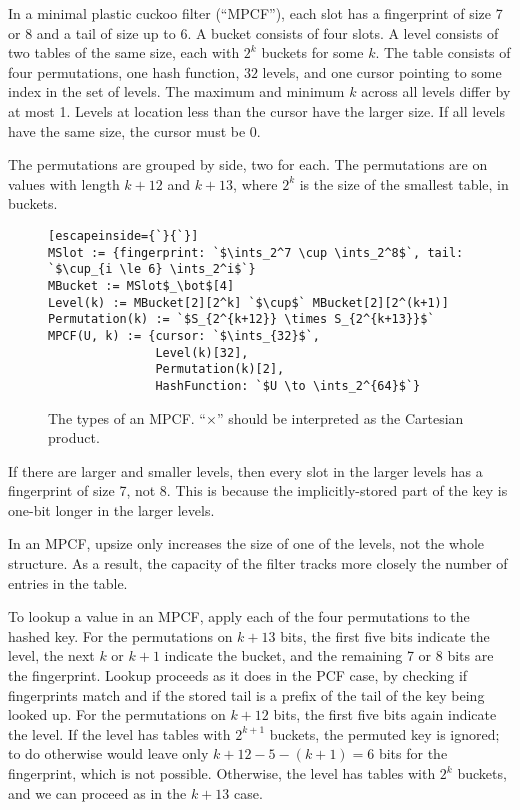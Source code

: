 \documentclass[letterpaper, 11pt]{article}
\newcommand{\ints}{\mathbb{Z}}
\begin{document}
In a minimal plastic cuckoo filter (``MPCF''), each slot has a fingerprint of size 7 or 8 and a tail of size up to 6.
A bucket consists of four slots.
A level consists of two tables of the same size, each with $2^k$ buckets for some $k$.
The table consists of four permutations, one hash function, $32$ levels, and one cursor pointing to some index in the set of levels.
The maximum and minimum $k$ across all levels differ by at most 1.
Levels at location less than the cursor have the larger size.
If all levels have the same size, the cursor must be 0.

The permutations are grouped by side, two for each.
The permutations are on values with length $k + 12$ and $k + 13$, where $2^k$ is the size of the smallest table, in buckets.

\begin{figure}
\begin{lstlisting}[escapeinside={`}{`}]
MSlot := {fingerprint: `$\ints_2^7 \cup \ints_2^8$`, tail: `$\cup_{i \le 6} \ints_2^i$`}
MBucket := MSlot$_\bot$[4]
Level(k) := MBucket[2][2^k] `$\cup$` MBucket[2][2^(k+1)]
Permutation(k) := `$S_{2^{k+12}} \times S_{2^{k+13}}$`
MPCF(U, k) := {cursor: `$\ints_{32}$`,
               Level(k)[32],
               Permutation(k)[2],
               HashFunction: `$U \to \ints_2^{64}$`}

\end{lstlisting}
\caption{The types of an MPCF.
``$\times$'' should be interpreted as the Cartesian product.
}
\end{figure}

If there are larger and smaller levels, then every slot in the larger levels has a fingerprint of size 7, not 8.
This is because the implicitly-stored part of the key is one-bit longer in the larger levels.

In an MPCF, upsize only increases the size of one of the levels, not the whole structure.
As a result, the capacity of the filter tracks more closely the number of entries in the table.

To lookup a value in an MPCF, apply each of the four permutations to the hashed key.
For the permutations on $k + 13$ bits, the first five bits indicate the level, the next $k$ or $k+1$ indicate the bucket, and the remaining 7 or 8 bits are the fingerprint.
Lookup proceeds as it does in the PCF case, by checking if fingerprints match and if the stored tail is a prefix of the tail of the key being looked up.
For the permutations on $k + 12$ bits, the first five bits again indicate the level.
If the level has tables with $2^{k+1}$ buckets, the permuted key is ignored; to do otherwise would leave only $k+12 - 5 - (k+1) = 6$ bits for the fingerprint, which is not possible.
Otherwise, the level has tables with $2^k$ buckets, and we can proceed as in the $k+13$ case.
\end{document}
